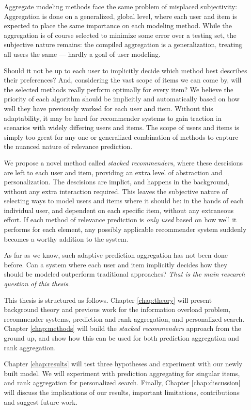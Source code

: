 Aggregate modeling methods face the same problem of misplaced subjectivity: 
Aggregation is done on a generalized, global level,
where each user and item is expected to place the same importance on each modeling method.
While the aggregation is of course selected to minimize some error over a testing set,
the subjective nature remains: the compiled aggregation is a generalization,
treating all users the same --- hardly a goal of user modeling.

Should it not be up to each user to implicitly decide which method best describes their preferences?
And, considering the vast scope of items we can come by, will the selected
methods really perform optimally for every item?
We believe the priority of each algorithm should be implicitly and automatically
based on how well they have previously worked for each user and item.
Without this adaptability, it may be hard for recommender systems
to gain traction in scenarios with widely differing users and items.
The scope of users and items is simply too great for any one or generalized combination
of methods to capture the nuanced nature of relevance prediction.

We propose a novel method called \emph{stacked recommenders}, where these descisions are left to each user and item,
providing an extra level of abstraction and personalization.
The descisions are implict, and happens in the background, without any extra interaction required.
This leaves the subjective nature of selecting ways to model users and items where it should be:
in the hands of each individual user, and dependent on each specific item, without any extraneous effort.
If each method of relevance prediction is \emph{only used} based on how well it performs for each element,
any possibly applicable recommender system suddenly becomes a worthy addition to the system.

As far as we know, such adaptive prediction aggregation has not been done before.
Can a system where each user and item implicitly decides how they should be modeled outperform traditional approaches?
\emph{That is the main research question of this thesis}.

\hr

\noindent
This thesis is structured as follows.
Chapter \ref{chap:theory} will present background theory and previous work for
the information overload problem, recommender systems, 
prediction and rank aggregation, and personalized search. 
Chapter \ref{chap:methods} will build the \emph{stacked recommenders} approach from the ground up,
and show how this can be used for both prediction aggregation and rank aggregation.

Chapter \ref{chap:results} will test three hypotheses and experiment with our newly built model.
We will experiment with prediction aggregating for singular items, and rank aggregation for personalized search.
Finally, Chapter \ref{chap:discussion} will discuss the implications of our results,
important limitations, contributions and suggest future work.


